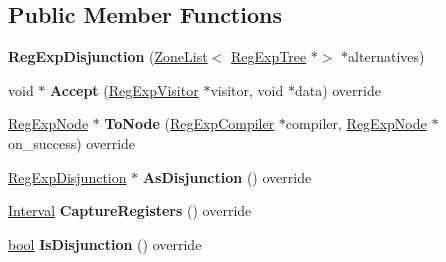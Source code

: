\subsection*{Public Member Functions}
\begin{DoxyCompactItemize}
\item 
\mbox{\label{classv8_1_1internal_1_1RegExpDisjunction_ad111d23946d6f96bc82ddfc1cce95a47}} 
{\bfseries Reg\+Exp\+Disjunction} (\mbox{\hyperlink{classv8_1_1internal_1_1ZoneList}{Zone\+List}}$<$ \mbox{\hyperlink{classv8_1_1internal_1_1RegExpTree}{Reg\+Exp\+Tree}} $\ast$$>$ $\ast$alternatives)
\item 
\mbox{\label{classv8_1_1internal_1_1RegExpDisjunction_a666bbc4efa67dc6b6cb2b3195a81718d}} 
void $\ast$ {\bfseries Accept} (\mbox{\hyperlink{classv8_1_1internal_1_1RegExpVisitor}{Reg\+Exp\+Visitor}} $\ast$visitor, void $\ast$data) override
\item 
\mbox{\label{classv8_1_1internal_1_1RegExpDisjunction_afdf2e65b80e7ee45e633c37d90f2a38a}} 
\mbox{\hyperlink{classv8_1_1internal_1_1RegExpNode}{Reg\+Exp\+Node}} $\ast$ {\bfseries To\+Node} (\mbox{\hyperlink{classv8_1_1internal_1_1RegExpCompiler}{Reg\+Exp\+Compiler}} $\ast$compiler, \mbox{\hyperlink{classv8_1_1internal_1_1RegExpNode}{Reg\+Exp\+Node}} $\ast$on\+\_\+success) override
\item 
\mbox{\label{classv8_1_1internal_1_1RegExpDisjunction_ac6f196bb8944cbfa390049ea17babad5}} 
\mbox{\hyperlink{classv8_1_1internal_1_1RegExpDisjunction}{Reg\+Exp\+Disjunction}} $\ast$ {\bfseries As\+Disjunction} () override
\item 
\mbox{\label{classv8_1_1internal_1_1RegExpDisjunction_a77966596119fee9bbdaff5d0e267e0b2}} 
\mbox{\hyperlink{classv8_1_1internal_1_1Interval}{Interval}} {\bfseries Capture\+Registers} () override
\item 
\mbox{\label{classv8_1_1internal_1_1RegExpDisjunction_addbeaff24ecb4b52e27f26694e270e97}} 
\mbox{\hyperlink{classbool}{bool}} {\bfseries Is\+Disjunction} () override
\item 
$$
\end{DoxyCompactItemize}
